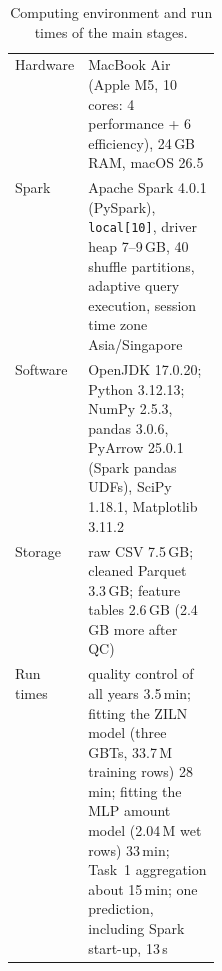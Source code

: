 \documentclass[lang=en,11pt,a4paper,bibend=bibtex]{elegantpaper}
\begin{document}
\begin{table}[H]
\centering\small
\caption{Computing environment and run times of the main stages.}\label{tab:env}
\renewcommand{\arraystretch}{1.15}
\begin{tabularx}{\linewidth}{@{}p{0.24\linewidth}Y@{}}
\toprule
Hardware & MacBook Air (Apple M5, 10 cores: 4 performance + 6 efficiency), 24\,GB RAM, macOS 26.5 \\
Spark & Apache Spark 4.0.1 (PySpark), \texttt{local[10]}, driver heap 7--9\,GB, 40 shuffle partitions, adaptive query execution, session time zone Asia/Singapore \\
Software & OpenJDK 17.0.20; Python 3.12.13; NumPy 2.5.3, pandas 3.0.6, PyArrow 25.0.1 (Spark pandas UDFs), SciPy 1.18.1, Matplotlib 3.11.2 \\
Storage & raw CSV 7.5\,GB; cleaned Parquet 3.3\,GB; feature tables 2.6\,GB (2.4\,GB more after QC) \\
\midrule
Run times & quality control of all years 3.5\,min; fitting the ZILN model (three GBTs, 33.7\,M training rows) 28\,min; fitting the MLP amount model (2.04\,M wet rows) 33\,min; Task~1 aggregation about 15\,min; one prediction, including Spark start-up, 13\,s \\
\bottomrule
\end{tabularx}
\end{table}
\end{document}
